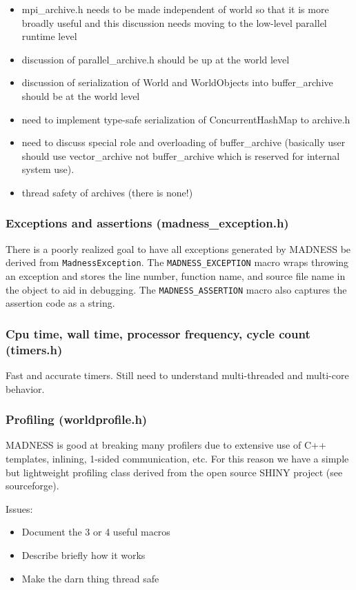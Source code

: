 \documentclass[letterpaper]{article}
\newcommand\liststyleLi{%
\renewcommand\labelitemi{${\bullet}$}
\renewcommand\labelitemii{${\circ}$}
\renewcommand\labelitemiii{${\blacksquare}$}
\renewcommand\labelitemiv{${\bullet}$}
}
\newcommand\liststyleLii{%
\renewcommand\labelitemi{${\bullet}$}
\renewcommand\labelitemii{${\circ}$}
\renewcommand\labelitemiii{${\blacksquare}$}
\renewcommand\labelitemiv{${\bullet}$}
}
\begin{document}
\liststyleLi
\begin{itemize}
\item mpi\_archive.h needs to be made independent of world so that it is more broadly useful and this discussion needs moving
to the low-level parallel runtime level
\item discussion of parallel\_archive.h should be up at the world level
\item discussion of serialization of World and WorldObjects into buffer\_archive should be at the world level
\item need to implement type-safe serialization of ConcurrentHashMap to archive.h
\item need to discuss special role and overloading of buffer\_archive (basically user should use vector\_archive not buffer\_archive which is reserved
for internal system use).
\item thread safety of archives (there is none!)
\end{itemize}
\subsubsection{Exceptions and assertions (madness\_exception.h)}
There is a poorly realized goal to have all exceptions generated by MADNESS be derived from \texttt{MadnessException}.
The \texttt{MADNESS\_EXCEPTION} macro wraps throwing an exception and stores the line number, function name, and source
file name in the object to aid in debugging. The \texttt{MADNESS\_ASSERTION} macro also captures the assertion code as
a string.

\subsubsection{Cpu time, wall time, processor frequency, cycle count (timers.h)}
Fast and accurate timers. Still need to understand multi-threaded and multi-core behavior.

\subsubsection{Profiling (worldprofile.h)}
MADNESS is good at breaking many profilers due to extensive use of C++ templates, inlining, 1-sided communication, etc.
For this reason we have a simple but lightweight profiling class derived from the open source SHINY project (see
sourceforge).

Issues:

\liststyleLii
\begin{itemize}
\item Document the 3 or 4 useful macros
\item Describe briefly how it works
\item Make the darn thing thread safe
\end{itemize}
\end{document}
